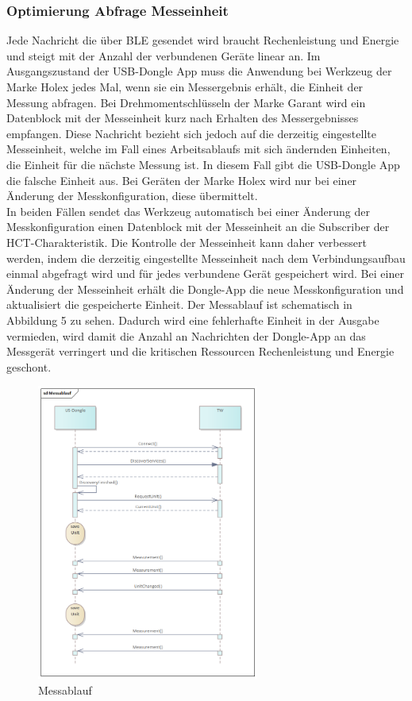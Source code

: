 \subsubsection{Optimierung Abfrage Messeinheit}
\label{OptimierungAbfrage}
Jede Nachricht die über \ac{BLE} gesendet wird braucht Rechenleistung und Energie und steigt mit der Anzahl der verbundenen Geräte linear an. Im Ausgangszustand der \ac{USB}-Dongle App muss die Anwendung bei Werkzeug der Marke Holex jedes Mal, wenn sie ein Messergebnis erhält, die Einheit der Messung abfragen. Bei Drehmomentschlüsseln der Marke Garant wird ein Datenblock mit der Messeinheit kurz nach Erhalten des Messergebnisses empfangen. Diese Nachricht bezieht sich jedoch auf die derzeitig eingestellte Messeinheit, welche im Fall eines Arbeitsablaufs mit sich ändernden Einheiten, die Einheit für die nächste Messung ist. In diesem Fall gibt die \ac{USB}-Dongle App die falsche Einheit aus. Bei Geräten der Marke Holex wird nur bei einer Änderung der Messkonfiguration, diese übermittelt.\\
In beiden Fällen sendet das Werkzeug automatisch bei einer Änderung der Messkonfiguration einen Datenblock mit der Messeinheit an die Subscriber der \ac{HCT}-Charakteristik. Die Kontrolle der Messeinheit kann daher verbessert werden, indem die derzeitig eingestellte Messeinheit nach dem Verbindungsaufbau einmal abgefragt wird und für jedes verbundene Gerät gespeichert wird. Bei einer Änderung der Messeinheit erhält die Dongle-App die neue Messkonfiguration und aktualisiert die gespeicherte Einheit. Der Messablauf ist schematisch in Abbildung 5 zu sehen. Dadurch wird eine fehlerhafte Einheit in der Ausgabe vermieden, wird damit die Anzahl an Nachrichten der Dongle-App an das Messgerät verringert und die kritischen Ressourcen Rechenleistung und Energie geschont.

\begin{figure}[H] 
	\centering
	\includegraphics[width=0.65\textwidth]{figures/Messablauf.png}
	\caption{Messablauf}
\end{figure}